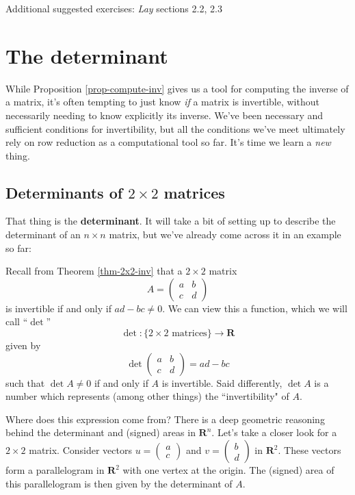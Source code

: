 \documentclass[12pt]{article}
\numberwithin{equation}{subsection}
\numberwithin{figure}{subsection}
\theoremstyle{note}
\begin{document}
Additional suggested exercises: \textit{Lay} sections 2.2, 2.3




\section{The determinant}
While Proposition \ref{prop-compute-inv} gives us a tool for computing the inverse of a matrix, it's often tempting to just know \textit{if} a matrix is invertible, without necessarily needing to know explicitly its inverse. We've been necessary and sufficient conditions for invertibility, but all the conditions we've meet ultimately rely on row reduction as a computational tool so far. It's time we learn a \textit{new} thing. 

\subsection{Determinants of $2\times 2$ matrices}
That thing is the \textbf{determinant}. It will take a bit of setting up to describe the determinant of an $n\times n$ matrix, but we've already come across it in an example so far: 

Recall from Theorem \ref{thm-2x2-inv} that a $2\times 2$ matrix \[ A=\begin{pmatrix} a & b\\ c & d\end{pmatrix}\] is invertible if and only if $ad-bc\neq0$. We can view this a function, which we will call ``$\det$'' \begin{equation} 
	\det \colon \{ \text{$2\times 2$ matrices} \} \to \mathbf{R}
\end{equation}
given by \begin{equation} \label{det-2x2} \det\begin{pmatrix} a & b \\ c & d \end{pmatrix}=ad-bc\end{equation} such that $\det A \neq 0$ if and only if $A$ is invertible. Said differently, $\det A$ is a number which represents (among other things) the ``invertibility" of $A$. 

Where does this expression come from? There is a deep geometric reasoning behind the determinant and (signed) areas in $\mathbf{R}^n$. Let's take a closer look for a $2\times 2$ matrix. Consider vectors $u=\begin{pmatrix} a \\ c\end{pmatrix}$ and $v=\begin{pmatrix} b \\ d\end{pmatrix}$ in $\mathbf{R}^2$. These vectors form a parallelogram in $\mathbf{R}^2$ with one vertex at the origin. The (signed) area of this parallelogram is then given by the determinant of $A$.
\end{document}
